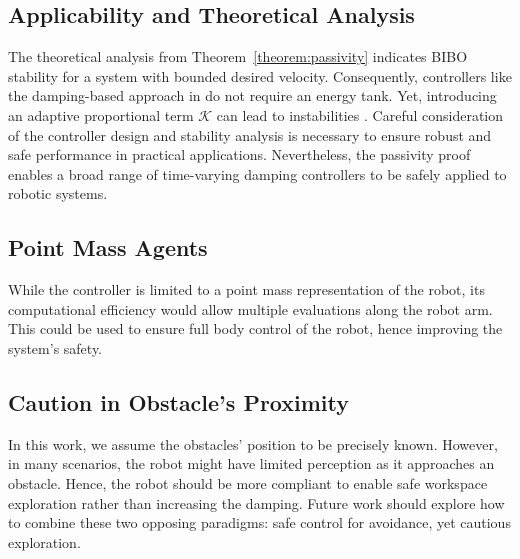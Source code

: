 \subsection{Applicability and Theoretical Analysis}
The theoretical analysis from Theorem~\ref{theorem:passivity} indicates BIBO stability for a system with bounded desired velocity. Consequently, controllers like the damping-based approach in \parencite{kronander2015passive} do not require an energy tank. Yet, introducing an adaptive proportional term $\mathcal{K}$ can lead to instabilities \parencite{ferraguti2013tank, kronander2016stability}. 
Careful consideration of the controller design and stability analysis is necessary to ensure robust and safe performance in practical applications. 
Nevertheless, the passivity proof enables a broad range of time-varying damping controllers to be safely applied to robotic systems.

\subsection{Point Mass Agents}
While the controller is limited to a point mass representation of the robot, its computational efficiency would allow multiple evaluations along the robot arm. This could be used to ensure full body control of the robot, hence improving the system's safety.

\subsection{Caution in Obstacle's Proximity}
In this work, we assume the obstacles' position to be precisely known. However, in many scenarios, the robot might have limited perception as it approaches an obstacle. Hence, the robot should be more compliant to enable safe workspace exploration rather than increasing the damping. Future work should explore how to combine these two opposing paradigms: safe control for avoidance, yet cautious exploration.
